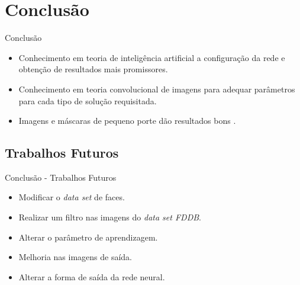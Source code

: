 \documentclass[aspectratio=169, xcolor=dvipsnames]{beamer}
\let\olditem=\item%
\renewcommand{\item}{\olditem \justifying}
\begin{document}
\section{Conclusão}
	\begin{frame}{Conclusão}
		\begin{itemize}
			\setlength\itemsep{1em}
			\item Conhecimento em teoria de inteligência artificial a configuração da rede e obtenção de resultados mais promissores.
			
			\item Conhecimento em teoria convolucional de imagens para adequar parâmetros para cada tipo de solução requisitada.
			
			\item Imagens e máscaras de pequeno porte dão resultados bons \cite{Garcia2004}.
		\end{itemize}
	\end{frame}

	\subsection{Trabalhos Futuros}
	\begin{frame}{Conclusão - Trabalhos Futuros}
		\begin{itemize}
			\setlength\itemsep{1em}
			
			\item Modificar o \textit{data set} de faces.
			
			\item Realizar um filtro nas imagens do \textit{data set FDDB}.
			
			\item Alterar o parâmetro de aprendizagem.
			
			\item Melhoria nas imagens de saída.
			
			\item Alterar a forma de saída da rede neural.
		\end{itemize}
	\end{frame}
\frame{\titlepage}




\frame{\titlepage}
\end{document}

